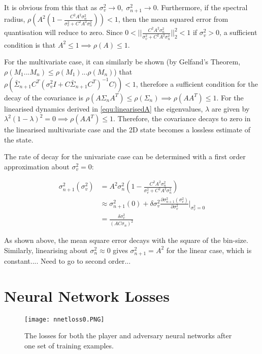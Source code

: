 \documentclass[../main.tex]{subfiles}
\begin{document}
{It is obvious from this that as $\sigma_v^2 \rightarrow 0, \; \sigma_{n+1}^2 \rightarrow 0$. Furthermore, if the spectral radius, $\rho \left(A^2(1 - \frac{C^2 A^2\sigma_n^2}{\sigma_v^2 + C^2 A^2 \sigma_n^2}) \right) < 1$, then the mean squared error from quantisation will reduce to zero. Since $0 < ||\frac{C^2 A^2\sigma_n^2}{\sigma_v^2 + C^2 A^2 \sigma_n^2}||^2_2 < 1$ if $\sigma_v^2 > 0$, a sufficient condition is that $A^2 \leq 1 \implies \rho(A) \leq 1$.

For the multivariate case, it can similarly be shown (by Gelfand's Theorem, $\rho(M_1 ... M_n) \leq \rho(M_1)...\rho(M_n)$) that $\rho\left(\bar{\Sigma}_{n+1}C^T (\sigma_v^2 I + C \bar{\Sigma}_{n+1} C^T)^{-1} C)\right) < 1$, therefore a sufficient condition for the decay of the covariance is $\rho(A \Sigma_n A^T) \leq \rho(\Sigma_n) \implies \rho(A A^T) \leq 1$. For the linearised dynamics derived in \cref{equ:linearisedA} the eigenvalues, $\lambda$ are given by $\lambda^2(1-\lambda)^2 = 0 \implies \rho(AA^T) \leq 1$. Therefore, the covariance decays to zero in the linearised multivariate case and the 2D state becomes a lossless estimate of the state.

The rate of decay for the univariate case can be determined with a first order approximation about $\sigma_v^2 = 0$:

\begin{align}
    \sigma_{n+1}^2(\sigma_v^2) &= A^2\sigma_n^2(1 - \frac{C^2 A^2\sigma_n^2}{\sigma_v^2 + C^2 A^2 \sigma_n^2}) \\
    &\approx \sigma_{n+1}^2(0) + \delta \sigma_v^2 \frac{\partial \sigma_{n+1}^2(\sigma_v^2)}{\partial \sigma_v^2}|_{\sigma_v^2 = 0} \\
    &= \frac{\delta \sigma_v^2}{(AC\sigma_n)^2}
\end{align}

As shown above, the mean square error decays with the square of the bin-size. Similarly, linearising about $\sigma_n^2 \approx 0$ gives $\sigma_{n+1}^2 = A^2$ for the linear case, which is constant.... Need to go to second order...

\section{Neural Network Losses}

\begin{figure}[h]
    \centering
    \texttt{[image: nnetloss0.PNG]}
    \caption{The losses for both the player and adversary neural networks after one set of training examples.}
    \label{fig:nnetlosses0}
\end{figure}

}
\end{document}
